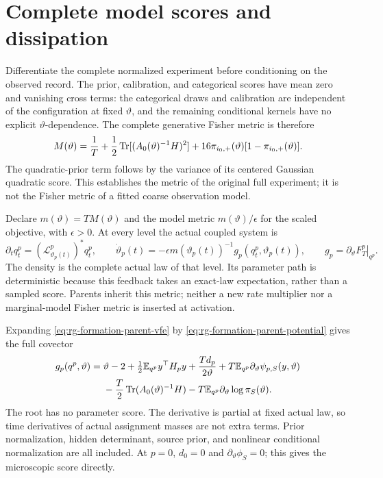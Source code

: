 \section{Complete model scores and dissipation}
\label{sec:rg-formation-learning}

Differentiate the complete normalized experiment before conditioning on
the observed record. The prior, calibration, and categorical scores
have mean zero and vanishing cross terms: the categorical draws and
calibration are independent of the configuration at fixed
\(\vartheta\), and the remaining conditional kernels have no explicit
\(\vartheta\)-dependence. The complete generative Fisher metric is
therefore
\begin{equation}
M(\vartheta)
=\frac1T+\frac12\operatorname{Tr}[(A_0(\vartheta)^{-1}H)^2]
 +16\pi_{i_0,+}(\vartheta)
       [1-\pi_{i_0,+}(\vartheta)].
\label{eq:rg-formation-model-fisher}
\end{equation}
The quadratic-prior term follows by the variance of its centered
Gaussian quadratic score. This establishes the metric of the original
full experiment; it is not the Fisher metric of a fitted coarse
observation model. 

Declare \(m(\vartheta)=TM(\vartheta)\) and the model metric
\(m(\vartheta)/\epsilon\) for the scaled objective, with
\(\epsilon>0\). At every level the actual coupled system is
\begin{equation}
\partial_tq_t^p=(\mathcal L_{\vartheta_p(t)}^p)^*q_t^p,
\qquad
\dot\vartheta_p(t)
  =-\epsilon m(\vartheta_p(t))^{-1}
        g_p(q_t^p,\vartheta_p(t)),
\qquad
g_p=\left.\partial_\vartheta F_T^p\right|_{q^p}.
\label{eq:rg-formation-own-law-dynamics}
\end{equation}
The density is the complete actual law of that level. Its parameter
path is deterministic because this feedback takes an exact-law
expectation, rather than a sampled score. Parents inherit this metric;
neither a new rate multiplier nor a marginal-model Fisher metric is
inserted at activation. 

Expanding \cref{eq:rg-formation-parent-vfe} by
\cref{eq:rg-formation-parent-potential} gives the full covector
\begin{equation}
\begin{aligned}
g_p(q^p,\vartheta)
={}&\vartheta-2+\tfrac12\mathbb E_{q^p}y^\top H_py
       +\frac{Td_p}{2\vartheta}
       +T\mathbb E_{q^p}\partial_\vartheta\psi_{p,S}(y,\vartheta)\\
 &-\frac T2\operatorname{Tr}(A_0(\vartheta)^{-1}H)
       -T\mathbb E_{q^p}\partial_\vartheta\log\pi_S(\vartheta).
\end{aligned}
\label{eq:rg-formation-complete-score}
\end{equation}
The root has no parameter score. The derivative is partial at fixed
actual law, so time derivatives of actual assignment masses are not
extra terms. Prior normalization, hidden determinant, source prior, and
nonlinear conditional normalization are all included. At \(p=0\),
\(d_0=0\) and \(\partial_\vartheta\phi_S=0\); this gives the
microscopic score directly. 

